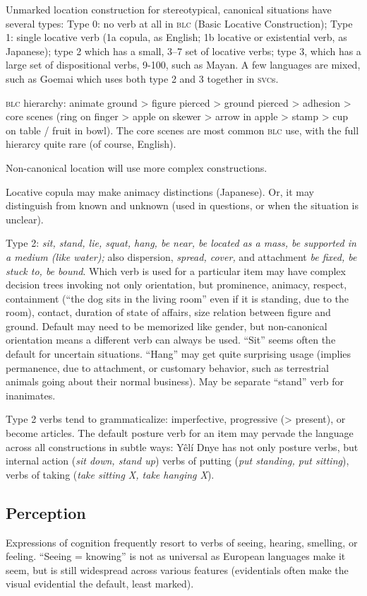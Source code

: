 \documentclass[11pt]{article}
\newcommand{\I}[1]{\textsc{#1}}   %
\begin{document}
Unmarked location construction for stereotypical, canonical situations
have several types: Type 0: no verb at all in \I{blc} (Basic Locative
Construction); Type 1: single locative verb (1a copula, as English; 1b
locative or existential verb, as Japanese); type 2 which has a small,
3--7 set of locative verbs; type 3, which has a large set of
dispositional verbs, 9-100, such as Mayan.  A few languages are mixed,
such as Goemai which uses both type 2 and 3 together in \I{svc}s.

\I{blc} hierarchy: animate ground > figure pierced > ground pierced >
adhesion > core scenes (ring on finger > apple on skewer > arrow in
apple > stamp > cup on table / fruit in bowl).  The core scenes are
most common \I{blc} use, with the full hierarcy quite rare (of course,
English).

Non-canonical location will use more complex constructions.  

Locative copula may make animacy distinctions (Japanese).  Or, it may
distinguish from known and unknown (used in questions, or when the
situation is unclear).

Type 2: \textit{sit, stand, lie, squat, hang, be near, be located as a
mass, be supported in a medium (like water);} also dispersion,
\textit{spread, cover,} and attachment \textit{be fixed, be stuck to,
be bound}.  Which verb is used for a particular item may have
complex decision trees invoking not only orientation, but
prominence, animacy, respect, containment (``the dog sits in the
living room'' even if it is standing, due to the room), contact,
duration of state of affairs, size relation between figure and ground.
Default may need to be memorized like gender, but non-canonical
orientation means a different verb can always be used.  ``Sit'' seems
often the default for uncertain situations.  ``Hang'' may get quite
surprising usage (implies permanence, due to attachment, or customary
behavior, such as terrestrial animals going about their normal
business).  May be separate ``stand'' verb for inanimates.

Type 2 verbs tend to grammaticalize: imperfective, progressive (>
present), or become articles.  The default posture verb for an item
may pervade the language across all constructions in subtle ways: Yêlí
Dnye has not only posture verbs, but internal action (\textit{sit
down, stand up}) verbs of putting (\textit{put standing, put
sitting}), verbs of taking (\textit{take sitting X, take hanging
X}).

\subsection{Perception}
Expressions of cognition frequently resort to verbs of seeing,
hearing, smelling, or feeling.  ``Seeing = knowing'' is not as
universal as European languages make it seem, but is still widespread
across various features (evidentials often make the visual evidential
the default, least marked).
\end{document}
